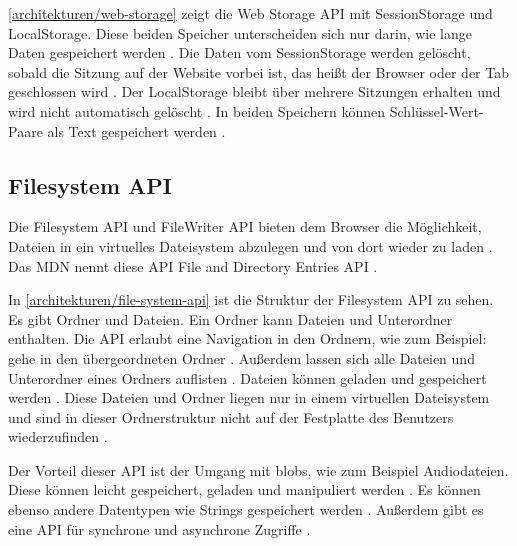 
\autoref{architekturen/web-storage} zeigt die Web Storage \ac{API} mit SessionStorage und LocalStorage. Diese beiden Speicher unterscheiden sich nur darin, wie lange Daten gespeichert werden \autocite{Hajian2019} \autocite{mdn-web-storage}. Die Daten vom SessionStorage werden gelöscht, sobald die Sitzung auf der Website vorbei ist, das heißt der Browser oder der Tab geschlossen wird \autocite{Hajian2019} \autocite{mdn-web-storage}. Der LocalStorage bleibt über mehrere Sitzungen erhalten und wird nicht automatisch gelöscht \autocite{Hajian2019} \autocite{mdn-web-storage}. In beiden Speichern können Schlüssel-Wert-Paare als Text gespeichert werden \autocite{Hajian2019} \autocite{mdn-web-storage}.

\subsection{Filesystem API}
Die Filesystem \ac{API} und FileWriter \ac{API} bieten dem Browser die Möglichkeit, Dateien in ein virtuelles Dateisystem abzulegen und von dort wieder zu laden \autocite{Hajian2019} \autocite{storage-for-the-web}. Das \ac{MDN} nennt diese \ac{API} File and Directory Entries \ac{API} \autocite{mdn-file-system}. 


In \autoref{architekturen/file-system-api} ist die Struktur der Filesystem \ac{API} zu sehen. Es gibt Ordner und Dateien. Ein Ordner kann Dateien und Unterordner enthalten. Die \ac{API} erlaubt eine Navigation in den Ordnern, wie zum Beispiel: gehe in den übergeordneten Ordner \autocite{mdn-file-system}. Außerdem lassen sich alle Dateien und Unterordner eines Ordners auflisten \autocite{mdn-file-system}. Dateien können geladen und gespeichert werden \autocite{mdn-file-system}. Diese Dateien und Ordner liegen nur in einem virtuellen Dateisystem und sind in dieser Ordnerstruktur nicht auf der Festplatte des Benutzers wiederzufinden \autocite{mdn-file-system}.

Der Vorteil dieser \ac{API} ist der Umgang mit \acp{blob}, wie zum Beispiel Audiodateien. Diese können leicht gespeichert, geladen und manipuliert werden \autocite{mdn-file-system}. Es können ebenso andere Datentypen wie Strings gespeichert werden \autocite{mdn-file-system}. Außerdem gibt es eine \ac{API} für synchrone und asynchrone Zugriffe \autocite{Hajian2019}. 

